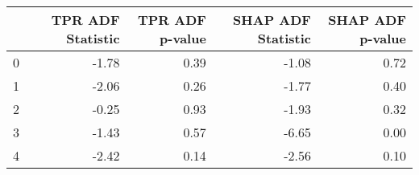 \begin{tabular}{lrrrr}
\toprule
 & TPR ADF Statistic & TPR ADF p-value & SHAP ADF Statistic & SHAP ADF p-value \\
\midrule
0 & -1.78 & 0.39 & -1.08 & 0.72 \\
1 & -2.06 & 0.26 & -1.77 & 0.40 \\
2 & -0.25 & 0.93 & -1.93 & 0.32 \\
3 & -1.43 & 0.57 & -6.65 & 0.00 \\
4 & -2.42 & 0.14 & -2.56 & 0.10 \\
\bottomrule
\end{tabular}
